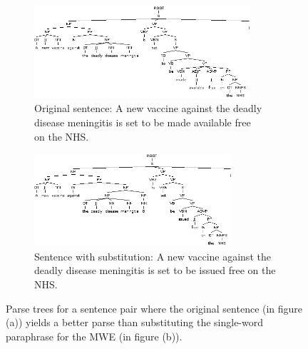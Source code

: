 \documentclass[11pt]{article}
\begin{document}
\begin{figure}
\centering
\begin{subfigure}{.5\textwidth}
  \centering
  \includegraphics[width=80mm]{figs/made_available_tree.png}
  \caption{Original sentence: A new vaccine against the deadly \\
disease meningitis is set to be made available free \\
on the NHS.}
  \label{fig:sub1}
\end{subfigure}%
\begin{subfigure}{.5\textwidth}
  \centering
  \includegraphics[width=73mm]{figs/issued_tree.png}
  \caption{Sentence with substitution: A new vaccine against the deadly disease meningitis is set to be issued free on the NHS.}
  \label{fig:sub2}
\end{subfigure}
\caption{Parse trees for a sentence pair where the original sentence (in figure (a)) yields a better parse than substituting the single-word paraphrase for the MWE (in figure (b)).}
\label{issued}
\end{figure}
\end{document}

